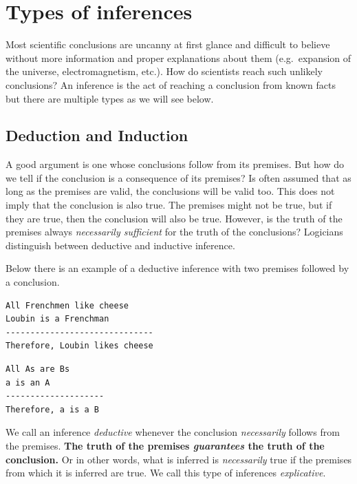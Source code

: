 \documentclass[
]{book}
\begin{document}
\hypertarget{types-of-inferences}{%
\section{Types of inferences}\label{types-of-inferences}}

Most scientific conclusions are uncanny at first glance and difficult to believe without more information and proper explanations about them (e.g.~expansion of the universe, electromagnetism, etc.). How do scientists reach such unlikely conclusions? An inference is the act of reaching a conclusion from known facts but there are multiple types as we will see below.

\hypertarget{deduction}{%
\subsection{Deduction and Induction}\label{deduction}}

A good argument is one whose conclusions follow from its premises. But how do we tell if the conclusion is a consequence of its premises? Is often assumed that as long as the premises are valid, the conclusions will be valid too. This does not imply that the conclusion is also true. The premises might not be true, but if they are true, then the conclusion will also be true. However, is the truth of the premises always \emph{necessarily sufficient} for the truth of the conclusions? Logicians distinguish between deductive and inductive inference. \citep{sep-abduction}

Below there is an example of a deductive inference with two premises followed by a conclusion.

\begin{verbatim}
All Frenchmen like cheese
Loubin is a Frenchman
------------------------------
Therefore, Loubin likes cheese
\end{verbatim}

\begin{verbatim}
All As are Bs
a is an A
--------------------
Therefore, a is a B
\end{verbatim}

We call an inference \emph{deductive} whenever the conclusion \emph{necessarily} follows from the premises. \textbf{The truth of the premises \emph{guarantees} the truth of the conclusion.} Or in other words, what is inferred is \emph{necessarily} true if the premises from which it is inferred are true. We call this type of inferences \emph{explicative}.
\end{document}
